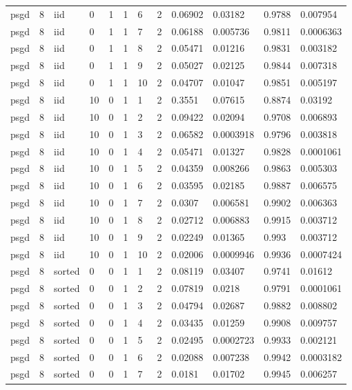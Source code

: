 \begin{tabular}{llllllllllll}
psgd & 8 & iid & 0 & 1 & 1 & 6 & 2 & 0.06902 & 0.03182 & 0.9788 & 0.007954 \\
psgd & 8 & iid & 0 & 1 & 1 & 7 & 2 & 0.06188 & 0.005736 & 0.9811 & 0.0006363 \\
psgd & 8 & iid & 0 & 1 & 1 & 8 & 2 & 0.05471 & 0.01216 & 0.9831 & 0.003182 \\
psgd & 8 & iid & 0 & 1 & 1 & 9 & 2 & 0.05027 & 0.02125 & 0.9844 & 0.007318 \\
psgd & 8 & iid & 0 & 1 & 1 & 10 & 2 & 0.04707 & 0.01047 & 0.9851 & 0.005197 \\
psgd & 8 & iid & 10 & 0 & 1 & 1 & 2 & 0.3551 & 0.07615 & 0.8874 & 0.03192 \\
psgd & 8 & iid & 10 & 0 & 1 & 2 & 2 & 0.09422 & 0.02094 & 0.9708 & 0.006893 \\
psgd & 8 & iid & 10 & 0 & 1 & 3 & 2 & 0.06582 & 0.0003918 & 0.9796 & 0.003818 \\
psgd & 8 & iid & 10 & 0 & 1 & 4 & 2 & 0.05471 & 0.01327 & 0.9828 & 0.0001061 \\
psgd & 8 & iid & 10 & 0 & 1 & 5 & 2 & 0.04359 & 0.008266 & 0.9863 & 0.005303 \\
psgd & 8 & iid & 10 & 0 & 1 & 6 & 2 & 0.03595 & 0.02185 & 0.9887 & 0.006575 \\
psgd & 8 & iid & 10 & 0 & 1 & 7 & 2 & 0.0307 & 0.006581 & 0.9902 & 0.006363 \\
psgd & 8 & iid & 10 & 0 & 1 & 8 & 2 & 0.02712 & 0.006883 & 0.9915 & 0.003712 \\
psgd & 8 & iid & 10 & 0 & 1 & 9 & 2 & 0.02249 & 0.01365 & 0.993 & 0.003712 \\
psgd & 8 & iid & 10 & 0 & 1 & 10 & 2 & 0.02006 & 0.0009946 & 0.9936 & 0.0007424 \\
psgd & 8 & sorted & 0 & 0 & 1 & 1 & 2 & 0.08119 & 0.03407 & 0.9741 & 0.01612 \\
psgd & 8 & sorted & 0 & 0 & 1 & 2 & 2 & 0.07819 & 0.0218 & 0.9791 & 0.0001061 \\
psgd & 8 & sorted & 0 & 0 & 1 & 3 & 2 & 0.04794 & 0.02687 & 0.9882 & 0.008802 \\
psgd & 8 & sorted & 0 & 0 & 1 & 4 & 2 & 0.03435 & 0.01259 & 0.9908 & 0.009757 \\
psgd & 8 & sorted & 0 & 0 & 1 & 5 & 2 & 0.02495 & 0.0002723 & 0.9933 & 0.002121 \\
psgd & 8 & sorted & 0 & 0 & 1 & 6 & 2 & 0.02088 & 0.007238 & 0.9942 & 0.0003182 \\
psgd & 8 & sorted & 0 & 0 & 1 & 7 & 2 & 0.0181 & 0.01702 & 0.9945 & 0.006257 \\

\end{tabular}
